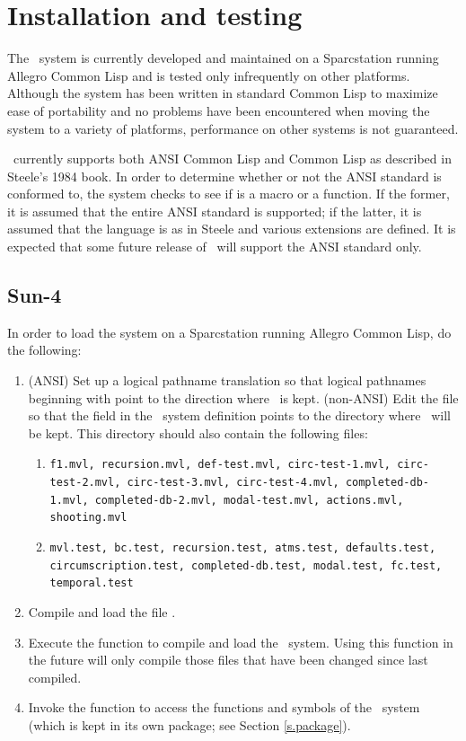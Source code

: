\section{Installation and testing}

The \mvl\ system is currently developed and maintained on a
Sparcstation running Allegro Common Lisp and is tested only
infrequently on other platforms.  Although the system has been written
in standard Common Lisp to maximize ease of portability and no
problems have been encountered when moving the system to a variety of
platforms, performance on other systems is not guaranteed.

\Mvl\ currently supports both ANSI Common Lisp and Common Lisp as
described in Steele's 1984 book.  In order to determine whether or not
the ANSI standard is conformed to, the system checks to see if
 is a macro or a function.  If the former, it is
assumed that the entire ANSI standard is supported; if the latter, it
is assumed that the language is as in Steele and various extensions
are defined.  It is expected that some future release of \mvl\ will
support the ANSI standard only.

\subsection{Sun-4}

In order to load the system on a Sparcstation running Allegro Common
Lisp, do the following:
 \begin{enumerate}

 \item (ANSI) Set up a logical pathname translation so that logical
pathnames beginning with  point to the direction where \mvl\
is kept.  (non-ANSI) Edit the file  so that the
\type{:default-pathname} field in the \mvl\ system definition points
to the directory where \mvl\ will be kept.  This directory should also
contain the following files:
 \begin{enumerate}\setlength{\itemsep}{0pt}\raggedright
 \item {\tt f1.mvl, recursion.mvl, def-test.mvl, circ-test-1.mvl,
circ-test-2.mvl, circ-test-3.mvl, circ-test-4.mvl, completed-db-1.mvl,
completed-db-2.mvl, modal-test.mvl, actions.mvl, shooting.mvl}
 \item {\tt mvl.test, bc.test, recursion.test, atms.test,
defaults.test, circumscription.test, completed-db.test, modal.test,
fc.test, temporal.test}
 \end{enumerate}
 \item Compile and load the file .
 \item Execute the function
 to compile and load the
\mvl\ system.  Using this function in the future will only compile 
those files that have been changed since last compiled.
 \item Invoke the function  to access the
functions and symbols of the \mvl\ system (which is kept in its own
package; see Section \ref{s.package}).
 \end{enumerate}

